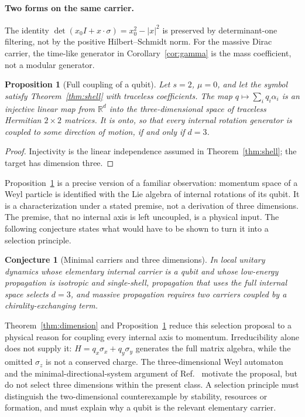 \documentclass[12pt]{article}
\newtheorem{proposition}[theorem]{Proposition}
\newtheorem{conjecture}[theorem]{Conjecture}
\theoremstyle{definition}
\theoremstyle{remark}
\begin{document}
\paragraph{Two forms on the same carrier.}\label{sec:example}
The identity $\det(x_0I+x\cdot\sigma)=x_0^2-|x|^2$ is preserved by
determinant-one filtering, not by the positive Hilbert--Schmidt norm.
For the massive Dirac carrier, the time-like generator in
Corollary~\ref{cor:gamma} is the mass coefficient, not a modular generator.

\begin{proposition}[Full coupling of a qubit]
\label{prop:qubit}
Let $s=2$, $\mu=0$, and let the symbol satisfy Theorem~\ref{thm:shell} with traceless coefficients. The map $q\mapsto\sum_iq_i\alpha_i$ is an injective linear map from $\mathbb R^d$ into the three-dimensional space of traceless Hermitian $2\times2$ matrices. It is onto, so that every internal rotation generator is coupled to some direction of motion, if and only if $d=3$.
\end{proposition}

\begin{proof}
Injectivity is the linear independence assumed in Theorem~\ref{thm:shell}; the target has dimension three.
\end{proof}

Proposition~\ref{prop:qubit} is a precise version of a familiar observation: momentum space of a Weyl particle is identified with the Lie algebra of internal rotations of its qubit. It is a characterization under a stated premise, not a derivation of three dimensions. The premise, that no internal axis is left uncoupled, is a physical input. The following conjecture states what would have to be shown to turn it into a selection principle.

\begin{conjecture}[Minimal carriers and three dimensions]
\label{conj:minimal}
In local unitary dynamics whose elementary internal carrier is a qubit and whose low-energy propagation is isotropic and single-shell, propagation that uses the full internal space selects $d=3$, and massive propagation requires two carriers coupled by a chirality-exchanging term.
\end{conjecture}

Theorem~\ref{thm:dimension} and Proposition~\ref{prop:qubit} reduce this selection proposal to a physical reason for coupling every internal axis to momentum. Irreducibility alone does not supply it: $H=q_x\sigma_x+q_y\sigma_y$ generates the full matrix algebra, while the omitted $\sigma_z$ is not a conserved charge. The three-dimensional Weyl automaton~\cite{DArianoPerinotti2014} and the minimal-directional-system argument of Ref.~\cite{MullerMasanes2013} motivate the proposal, but do not select three dimensions within the present class. A selection principle must distinguish the two-dimensional counterexample by stability, resources or formation, and must explain why a qubit is the relevant elementary carrier.
\end{document}
